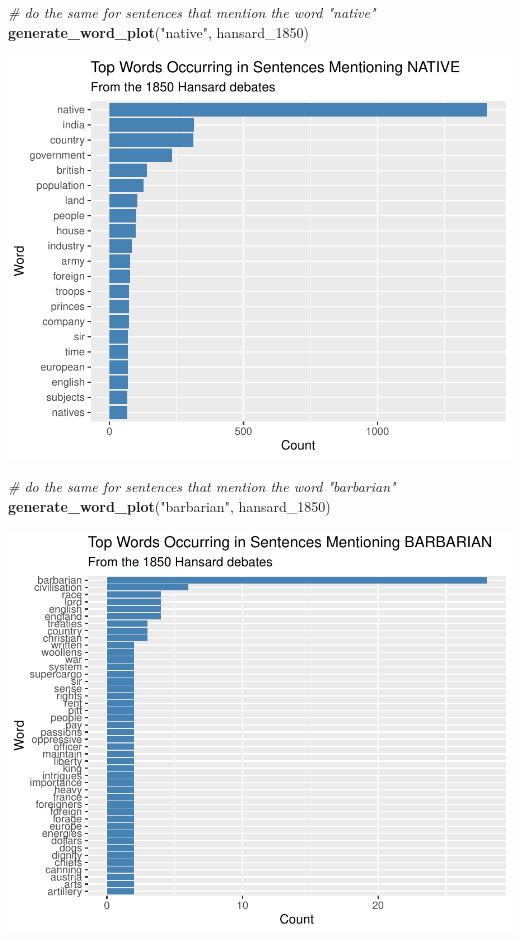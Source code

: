 \documentclass[
]{article}
\newenvironment{Shaded}{\begin{snugshade}}{\end{snugshade}}
\newcommand{\CommentTok}[1]{\textcolor[rgb]{0.56,0.35,0.01}{\textit{#1}}}
\newcommand{\FunctionTok}[1]{\textcolor[rgb]{0.13,0.29,0.53}{\textbf{#1}}}
\newcommand{\NormalTok}[1]{#1}
\newcommand{\StringTok}[1]{\textcolor[rgb]{0.31,0.60,0.02}{#1}}
\begin{document}
\begin{Shaded}
\begin{Highlighting}[]
\CommentTok{\# do the same for sentences that mention the word "native"}
\FunctionTok{generate\_word\_plot}\NormalTok{(}\StringTok{"native"}\NormalTok{, hansard\_1850)}
\end{Highlighting}
\end{Shaded}

\includegraphics[width=0.8\linewidth]{ch1-11.25.2024_files/figure-latex/unnamed-chunk-44-1}

\begin{Shaded}
\begin{Highlighting}[]
\CommentTok{\# do the same for sentences that mention the word "barbarian"}
\FunctionTok{generate\_word\_plot}\NormalTok{(}\StringTok{"barbarian"}\NormalTok{, hansard\_1850)}
\end{Highlighting}
\end{Shaded}

\includegraphics[width=0.8\linewidth]{ch1-11.25.2024_files/figure-latex/unnamed-chunk-45-1}
\end{document}
